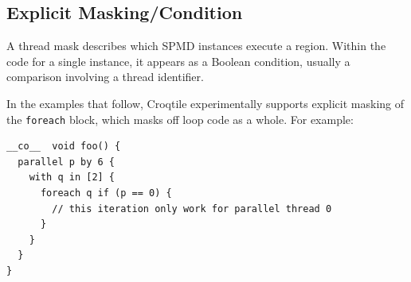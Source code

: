 \subsection*{Explicit Masking/Condition}

A thread mask describes which SPMD instances execute a region. Within the code for a single instance, it appears as a Boolean condition, usually a comparison involving a thread identifier.

In the examples that follow, Croqtile experimentally supports explicit masking of the \texttt{foreach} block, which masks off loop code as a whole. For example:

\begin{lstlisting}[language=croqtile,caption={Explicit Masking/Condition}]
__co__  void foo() {
  parallel p by 6 {
    with q in [2] {
      foreach q if (p == 0) {
        // this iteration only work for parallel thread 0
      }
    }
  }
}
\end{lstlisting}
